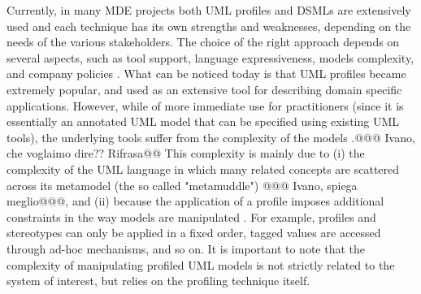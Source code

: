 Currently, in many MDE projects both UML profiles and DSMLs are extensively used and each technique has its own strengths and weaknesses, depending on the needs of the various stakeholders.
The choice of the right approach depends on several aspects, such as tool support, language expressiveness,
models complexity, and company policies \cite{comparison}.
What can be noticed today is that UML profiles became extremely popular, and used as an extensive tool for describing domain specific applications. However, while of more immediate use for practitioners (since it is essentially an annotated UML model that can be specified using existing UML tools), the underlying tools suffer from the complexity of the models \cite{comparison}\cite{france}.@@@ Ivano, che voglaimo dire?? Rifrasa@@
This complexity is mainly due to (i) the complexity of the UML language in which many related concepts are scattered across its metamodel
(the so called "metamuddle") \cite{france} @@@ Ivano, spiega meglio@@@, and
(ii) because the application of a profile imposes additional constraints in the way models are manipulated \cite{UMLprofile}. For example, profiles and stereotypes can only be applied in a fixed order, tagged values are accessed through ad-hoc mechanisms, and so on.
It is important to note that the complexity of manipulating profiled UML models is not strictly related to
the system of interest, but relies on the profiling technique itself.

